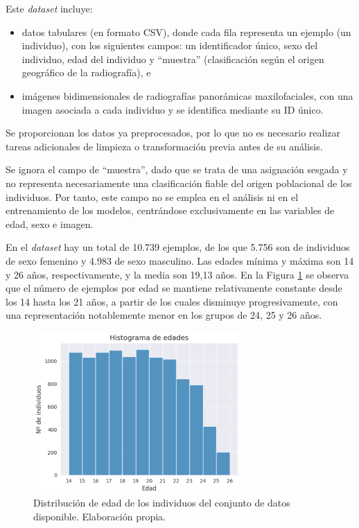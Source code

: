 Este \textit{dataset} incluye:

\begin{itemize}

    \item datos tabulares (en formato CSV), donde cada fila representa un ejemplo (un individuo), con los 
    siguientes campos: un identificador único, sexo del individuo, edad del individuo y ``muestra'' 
    (clasificación según el origen geográfico de la radiografía), e

    \item imágenes bidimensionales de radiografías panorámicas maxilofaciales, con una imagen asociada 
    a cada individuo y se identifica mediante su ID único. 

\end{itemize}

Se proporcionan los datos ya preprocesados, por lo que no es necesario realizar tareas adicionales de limpieza 
o transformación previa antes de su análisis.

Se ignora el campo de ``muestra'', dado que se trata de una asignación
sesgada y no representa necesariamente una clasificación fiable del origen poblacional de los individuos.
Por tanto, este campo no se emplea en el análisis ni en el entrenamiento de los modelos, centrándose 
exclusivamente en las variables de edad, sexo e imagen.

En el \textit{dataset} hay un total de 10.739 ejemplos, de los que 5.756 son de individuos de sexo femenino 
y 4.983 de sexo masculino. 
Las edades mínima y máxima son 14 y 26 años, respectivamente, y la media son 19,13 años.
En la Figura \ref{fig:histogram_ages} se observa que el número de ejemplos por edad se mantiene relativamente 
constante desde los 14 hasta los 21 años, a partir de los cuales disminuye progresivamente, con una 
representación notablemente menor en los grupos de 24, 25 y 26 años.
 
\begin{figure}[h]
    \centering
    \includegraphics[width=0.7\textwidth]{capitulos/cap_04/imagenes/histogram_ages.png}
    \caption[
        Distribución de edad de los individuos del conjunto de datos disponible.
    ]{
        Distribución de edad de los individuos del conjunto de datos disponible. Elaboración propia.
    } 
    \label{fig:histogram_ages}
\end{figure}

